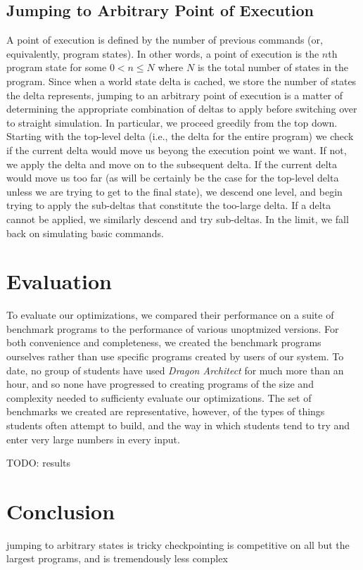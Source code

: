 \documentclass{sig-alternate}
\newcommand{\da}{\emph{Dragon Architect}}
\newcommand{\todo}[1]{{\color{red} TODO: #1}}
\begin{document}
\subsection{Jumping to Arbitrary Point of Execution}

A point of execution is defined by the number of previous commands (or, equivalently, program states). In other words, a point of execution is the $n$th program state for some $0<n\le N$ where $N$ is the total number of states in the program. Since when a world state delta is cached, we store the number of states the delta represents, jumping to an arbitrary point of execution is a matter of determining the appropriate combination of deltas to apply before switching over to straight simulation. In particular, we proceed greedily from the top down. Starting with the top-level delta (i.e., the delta for the entire program) we check if the current delta would move us beyong the execution point we want. If not, we apply the delta and move on to the subsequent delta. If the current delta would move us too far (as will be certainly be the case for the top-level delta unless we are trying to get to the final state), we descend one level, and begin trying to apply the sub-deltas that constitute the too-large delta. If a delta cannot be applied, we similarly descend and try sub-deltas. In the limit, we fall back on simulating basic commands. 

\section{Evaluation}
To evaluate our optimizations, we compared their performance on a suite of benchmark programs to the performance of various unoptmized versions. For both convenience and completeness, we created the benchmark programs ourselves rather than use specific programs created by users of our system. To date, no group of students have used \da{} for much more than an hour, and so none have progressed to creating programs of the size and complexity needed to sufficienty evaluate our optimizations. The set of benchmarks we created are representative, however, of the types of things students often attempt to build, and the way in which students tend to try and enter very large numbers in every input. 

\todo{results}

\section{Conclusion}
jumping to arbitrary states is tricky
checkpointing is competitive on all but the largest programs, and is tremendously less complex
\end{document}
